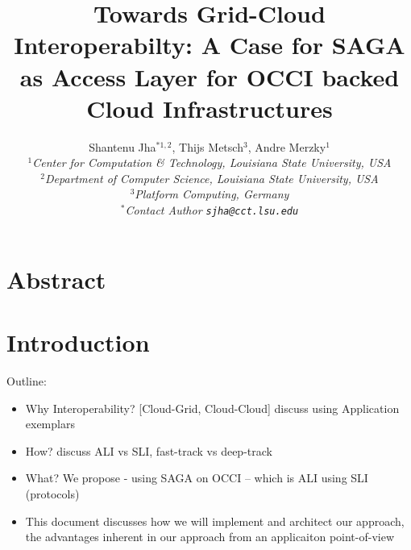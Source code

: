 \documentclass[10pt,conference,final,letterpaper,twoside,twocolumn,]{IEEEtran}
\begin{document}
\title{Towards Grid-Cloud Interoperabilty: A Case for SAGA as Access
  Layer for OCCI backed Cloud Infrastructures}

\author{Shantenu Jha$^{*1,2}$, Thijs Metsch$^{3}$, Andre Merzky$^{1}$\\
  \small{\emph{$^{1}$Center for Computation \& Technology, Louisiana State University, USA}}\\
  \small{\emph{$^{2}$Department of Computer Science, Louisiana State University, USA}}\\
  \small{\emph{$^{3}$Platform   Computing, Germany}}\\
  \small{\emph{$^{*}$Contact Author \texttt{sjha@cct.lsu.edu}}}
  }


\maketitle

\section*{Abstract}



\section{Introduction}

Outline:
\begin{itemize}
\item Why Interoperability? [Cloud-Grid, Cloud-Cloud] discuss using
  Application exemplars
\item How? discuss ALI vs SLI, fast-track vs deep-track
\item What? We propose - using SAGA on OCCI -- which is ALI using SLI
  (protocols)
\item This document discusses how we will implement and architect our
  approach, the advantages inherent in our approach from an
  applicaiton point-of-view
\end{itemize}
\end{document}

